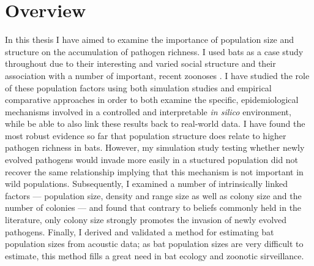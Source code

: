 
\section{Overview}

In this thesis I have aimed to examine the importance of population size and structure on the accumulation of pathogen richness.
I used bats as a case study throughout due to their interesting and varied social structure \cite{kerth2008causes} and their association with a number of important, recent zoonoses \cite{leroy2005fruit, field2001natural, halpin2011pteropid, li2005bats}.
I have studied the role of these population factors using both simulation studies and empirical comparative approaches in order to both examine the specific, epidemiological mechanisms involved in a controlled and interpretable \emph{in silico} environment, while be able to also link these results back to real-world data.
I have found the most robust evidence so far that population structure does relate to higher pathogen richness in bats.
However, my simulation study testing whether newly evolved pathogens would invade more easily in a stuctured population did not recover the same relationship implying that this mechanism is not important in wild populations.
Subsequently, I examined a number of intrinsically linked factors --- population size, density and range size as well as colony size and the number of colonies --- and found that contrary to beliefs commonly held in the literature, only colony size strongly promotes the invasion of newly evolved pathogens.
Finally, I derived and validated a method for estimating bat population sizes from acoustic data; as bat population sizes are very difficult to estimate, this method fills a great need in bat ecology and zoonotic sirveillance.




